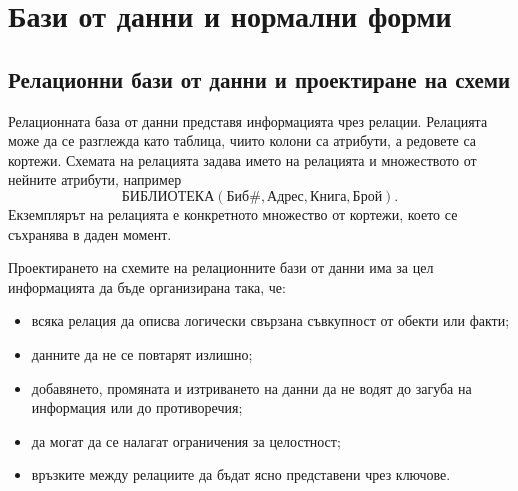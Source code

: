 \begin{konspekt}
\end{konspekt}

\section{Бази от данни и нормални форми}\label{s:24.1}

\subsection{Релационни бази от данни и проектиране на схеми}\label{s:24.1.1}

Релационната база от данни представя информацията чрез релации. Релацията може да се разглежда като таблица, чиито колони са атрибути, а редовете са кортежи. Схемата на релацията задава името на релацията и множеството от нейните атрибути, например
\[
\mathrm{БИБЛИОТЕКА}(\mathrm{Биб\#},\mathrm{Адрес},\mathrm{Книга},\mathrm{Брой}).
\]
Екземплярът на релацията е конкретното множество от кортежи, което се съхранява в даден момент.

Проектирането на схемите на релационните бази от данни има за цел информацията да бъде организирана така, че:

\begin{itemize}
    \item всяка релация да описва логически свързана съвкупност от обекти или факти;
    \item данните да не се повтарят излишно;
    \item добавянето, промяната и изтриването на данни да не водят до загуба на информация или до противоречия;
    \item да могат да се налагат ограничения за целостност;
    \item връзките между релациите да бъдат ясно представени чрез ключове.
\end{itemize}

